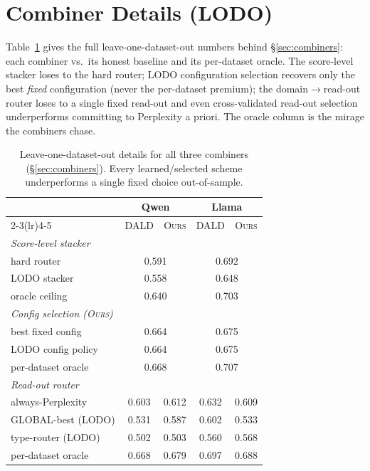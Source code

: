 \documentclass[11pt]{article}
\newcommand{\ours}{\textsc{Ours}}
\newcommand{\dald}{\textsc{DALD}}
\begin{document}
\section{Combiner Details (LODO)}\label{app:combiners}
Table~\ref{tab:app-lodo} gives the full leave-one-dataset-out numbers behind
\S\ref{sec:combiners}: each combiner vs.\ its honest baseline and its per-dataset oracle.
The score-level stacker loses to the hard router; LODO configuration selection recovers
only the best \emph{fixed} configuration (never the per-dataset premium); the
domain$\to$read-out router loses to a single fixed read-out and even cross-validated
read-out selection underperforms committing to Perplexity a priori. The oracle column is
the mirage the combiners chase.

\begin{table}[t]\centering\small
\setlength{\tabcolsep}{3.5pt}
\begin{tabular}{l cccc}
\toprule
& \multicolumn{2}{c}{Qwen} & \multicolumn{2}{c}{Llama}\\
\cmidrule(lr){2-3}\cmidrule(lr){4-5}
& \dald & \ours & \dald & \ours\\
\midrule
\multicolumn{5}{l}{\emph{Score-level stacker}}\\
hard router          & \multicolumn{2}{c}{0.591} & \multicolumn{2}{c}{0.692}\\
LODO stacker         & \multicolumn{2}{c}{0.558} & \multicolumn{2}{c}{0.648}\\
oracle ceiling       & \multicolumn{2}{c}{0.640} & \multicolumn{2}{c}{0.703}\\
\midrule
\multicolumn{5}{l}{\emph{Config selection (\ours)}}\\
best fixed config    & \multicolumn{2}{c}{0.664} & \multicolumn{2}{c}{0.675}\\
LODO config policy   & \multicolumn{2}{c}{0.664} & \multicolumn{2}{c}{0.675}\\
per-dataset oracle   & \multicolumn{2}{c}{0.668} & \multicolumn{2}{c}{0.707}\\
\midrule
\multicolumn{5}{l}{\emph{Read-out router}}\\
always-Perplexity    & 0.603 & 0.612 & 0.632 & 0.609\\
GLOBAL-best (LODO)   & 0.531 & 0.587 & 0.602 & 0.533\\
type-router (LODO)   & 0.502 & 0.503 & 0.560 & 0.568\\
per-dataset oracle   & 0.668 & 0.679 & 0.697 & 0.688\\
\bottomrule
\end{tabular}
\caption{Leave-one-dataset-out details for all three combiners (\S\ref{sec:combiners}).
Every learned/selected scheme underperforms a single fixed choice out-of-sample.}
\label{tab:app-lodo}
\end{table}
\end{document}
